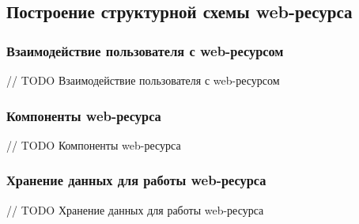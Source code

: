    \subsection{Построение структурной схемы web-ресурса}
        \subsubsection{Взаимодействие пользователя с web-ресурсом}
        // TODO Взаимодействие пользователя с web-ресурсом

        \subsubsection{Компоненты web-ресурса}
        // TODO Компоненты web-ресурса

        \subsubsection{Хранение данных для работы web-ресурса}
        // TODO Хранение данных для работы web-ресурса


\clearpage
